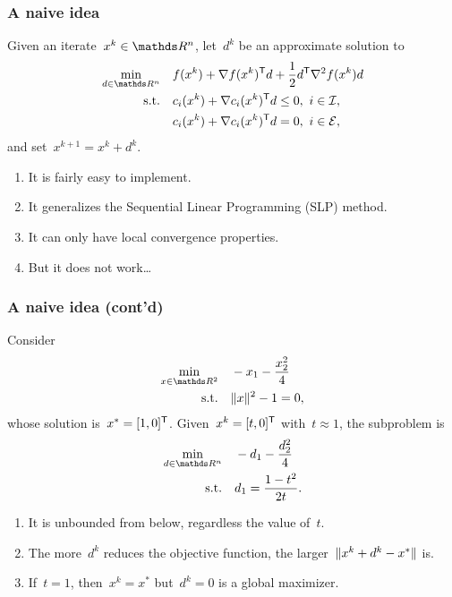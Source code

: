 \documentclass{polyu-presentation}
\newcommand{\con}[1]{c_{#1}}
\newcommand{\ieq}{\mathcal{E}}
\newcommand{\iub}{\mathcal{I}}
\newcommand{\obj}{f}
\begin{document}
\begin{frame}
    \frametitle{A naive idea}

    Given an iterate~$x^k \in \R^n$, let~$d^k$ be an approximate solution to
    \begin{align*}
        \min_{d \in \R^n}   & \quad \obj(x^k) + \nabla \obj(x^k)^{\T} d + \frac{1}{2} d^{\T} \nabla^2 \obj(x^k) d\\
        \text{s.t.}         & \quad \con{i}(x^k) + \nabla \con{i}(x^k)^{\T} d \le 0, ~ i \in \iub,\\
                            & \quad \con{i}(x^k) + \nabla \con{i}(x^k)^{\T} d = 0, ~ i \in \ieq,
    \end{align*}
    and set~$x^{k + 1} = x^k + d^k$.
    
    \medskip

    \begin{block}{}
        \begin{enumerate}[<+(1)->]
            \item It is fairly easy to \alert{implement}.
            \item It generalizes the \alert{Sequential Linear Programming} (SLP) method.
            \item It can only have \alert{local convergence} properties.
            \item But it does \alert{not} work\dots
        \end{enumerate}
    \end{block}
\end{frame}

\begin{frame}
    \frametitle{A naive idea (cont'd)}

    Consider
    \begin{align*}
        \min_{x \in \R^2}   & \quad -x_1 - \frac{x_2^2}{4}\\
        \text{s.t.}         & \quad \norm{x}^2 - 1 = 0,
    \end{align*}
    whose \alert{solution} is~$x^{\ast} = [1, 0]^{\mathsf{T}}$.
    Given~$x^k = [t, 0]^{\mathsf{T}}$ with~$t \approx 1$, the subproblem is
    \begin{align*}
        \min_{d \in \R^n}   & \quad -d_1 - \frac{d_2^2}{4}\\
        \text{s.t.}         & \quad d_1 = \frac{1 - t^2}{2t}.
    \end{align*}

    \begin{block}{}
        \begin{enumerate}[<+(1)->]
            \item It is \alert{unbounded from below}, regardless the value of~$t$.
            \item The more~$d^k$ \alert{reduces} the objective function, the \alert{larger}~$\lVert x^k + d^k - x^{\ast}\rVert$ is.
            \item If~$t = 1$, then~$x^k = x^{\ast}$ but~$d^k = 0$ is a \alert{global maximizer}.
        \end{enumerate}
    \end{block}
\end{frame}
\end{document}
